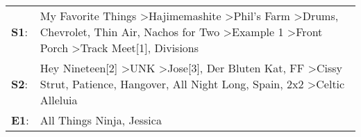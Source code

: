 \begin{supertabular}{p{0.03\textwidth}p{0.92\textwidth}}
 \textbf{S1}:  &  My Favorite Things\textsuperscript{} \textgreater \enspace Hajimemashite\textsuperscript{} \textgreater \enspace Phil's Farm\textsuperscript{} \textgreater \enspace Drums\textsuperscript{}, \enspace Chevrolet\textsuperscript{}, \enspace Thin Air\textsuperscript{}, \enspace Nachos for Two\textsuperscript{} \textgreater \enspace Example 1\textsuperscript{} \textgreater \enspace Front Porch\textsuperscript{} \textgreater \enspace Track Meet[1]\textsuperscript{}, \enspace Divisions\textsuperscript{}  \enspace  \\
 \textbf{S2}:  &            Hey Nineteen[2]\textsuperscript{} \textgreater \enspace UNK\textsuperscript{} \textgreater \enspace Jose[3]\textsuperscript{}, \enspace Der Bluten Kat\textsuperscript{}, \enspace FF\textsuperscript{} \textgreater \enspace Cissy Strut\textsuperscript{}, \enspace Patience\textsuperscript{}, \enspace Hangover\textsuperscript{}, \enspace All Night Long\textsuperscript{}, \enspace Spain\textsuperscript{}, \enspace 2x2\textsuperscript{} \textgreater \enspace Celtic Alleluia\textsuperscript{}  \enspace  \\
 \textbf{E1}:  &                                                                                                                                                                                                                                                                                                                                                                                                                                                All Things Ninja\textsuperscript{}, \enspace Jessica\textsuperscript{}  \enspace  \\
\end{supertabular}

